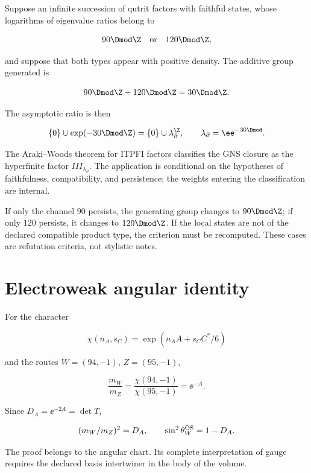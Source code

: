 Suppose an infinite succession of qutrit factors with faithful states, whose logarithms of eigenvalue ratios belong to

\[
90\Dmod\Z\quad\text{or}\quad120\Dmod\Z,
\]

and suppose that both types appear with positive density. The additive group generated is

\[
90\Dmod\Z+120\Dmod\Z=30\Dmod\Z.
\]

The asymptotic ratio is then

\[
\{0\}\cup\exp(-30\Dmod\Z)
=\{0\}\cup\lambda_\partial^\Z,
\qquad \lambda_\partial=\ee^{-30\Dmod}.
\]

The Araki--Woods theorem for ITPFI factors classifies the GNS closure as the hyperfinite factor \(III_{\lambda_\partial}\). The application is conditional on the hypotheses of faithfulness, compatibility, and persistence; the weights entering the classification are internal.

\begin{remark}
If only the channel \(90\) persists, the generating group changes to \(90\Dmod\Z\); if only \(120\) persists, it changes to \(120\Dmod\Z\). If the local states are not of the declared compatible product type, the criterion must be recomputed. These cases are refutation criteria, not stylistic notes.
\end{remark}


\section{Electroweak angular identity}

For the character

\[
\chi(n_A,s_C)=\exp(n_AA+s_CC^*/6)
\]

and the routes \(W=(94,-1)\), \(Z=(95,-1)\),

\[
\frac{m_W}{m_Z}=\frac{\chi(94,-1)}{\chi(95,-1)}
=\ee^{-A}.
\]

Since \(D_A=\ee^{-2A}=\det T\),

\[
(m_W/m_Z)^2=D_A,\qquad
\sin^2\theta_W^{\rm OS}=1-D_A.
\]

The proof belongs to the angular chart. Its complete interpretation of
gauge requires the declared basis intertwiner in the body of the volume.
